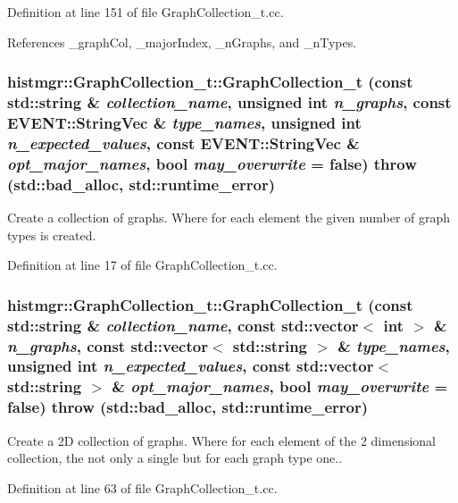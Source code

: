 Definition at line 151 of file GraphCollection\_\-t.cc.

References \_\-graphCol, \_\-majorIndex, \_\-nGraphs, and \_\-nTypes.
\subsubsection[{GraphCollection\_\-t}]{\setlength{\rightskip}{0pt plus 5cm}histmgr::GraphCollection\_\-t::GraphCollection\_\-t (const std::string \& {\em collection\_\-name}, \/  unsigned int {\em n\_\-graphs}, \/  const EVENT::StringVec \& {\em type\_\-names}, \/  unsigned int {\em n\_\-expected\_\-values}, \/  const EVENT::StringVec \& {\em opt\_\-major\_\-names}, \/  bool {\em may\_\-overwrite} = {\ttfamily false})  throw (std::bad\_\-alloc, std::runtime\_\-error)}\label{classhistmgr_1_1GraphCollection__t_adb06c0097232711c8f9e3f1cd9f13781}


Create a collection of graphs. Where for each element the given number of graph types is created. 

Definition at line 17 of file GraphCollection\_\-t.cc.
\subsubsection[{GraphCollection\_\-t}]{\setlength{\rightskip}{0pt plus 5cm}histmgr::GraphCollection\_\-t::GraphCollection\_\-t (const std::string \& {\em collection\_\-name}, \/  const std::vector$<$ int $>$ \& {\em n\_\-graphs}, \/  const std::vector$<$ std::string $>$ \& {\em type\_\-names}, \/  unsigned int {\em n\_\-expected\_\-values}, \/  const std::vector$<$ std::string $>$ \& {\em opt\_\-major\_\-names}, \/  bool {\em may\_\-overwrite} = {\ttfamily false})  throw (std::bad\_\-alloc, std::runtime\_\-error)}\label{classhistmgr_1_1GraphCollection__t_a6f1026c0d3a09485010e792b05bbc0d2}


Create a 2D collection of graphs. Where for each element of the 2 dimensional collection, the not only a single but for each graph type one.. 

Definition at line 63 of file GraphCollection\_\-t.cc.

